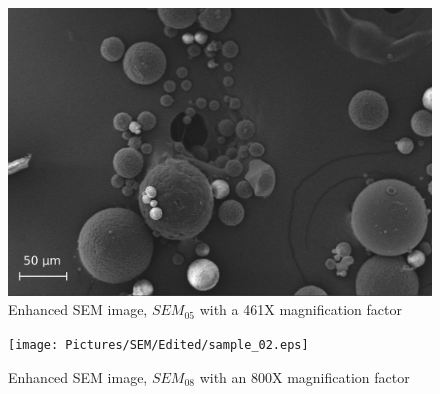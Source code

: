 \documentclass{article}
\begin{document}
      
          \begin{figure}[h!]
              \centering 
              \includegraphics[width=\textwidth]{Pictures/SEM/Edited/06_01.eps}
              \caption{Enhanced SEM image, $SEM_{05}$ with a 461X magnification factor}
              \label{fig:SEM_05}
          \end{figure}
      
      
      
          \begin{figure}[h!]
              \centering 
              \texttt{[image: Pictures/SEM/Edited/sample\_02.eps]}
              \caption{Enhanced SEM image, $SEM_{08}$ with an 800X magnification factor}
              \label{fig:SEM_08}
          \end{figure}
      
\end{document}
